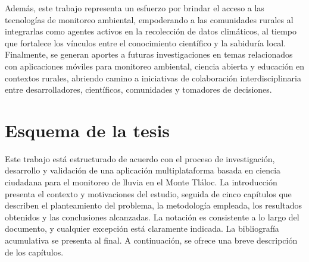 Además, este trabajo representa un esfuerzo por brindar el acceso a las tecnologías de monitoreo ambiental, empoderando a las comunidades rurales al integrarlas como agentes activos en la recolección de datos climáticos, al tiempo que fortalece los vínculos entre el conocimiento científico y la sabiduría local. Finalmente, se generan aportes a futuras investigaciones en temas relacionados con aplicaciones móviles para monitoreo ambiental, ciencia abierta y educación en contextos rurales, abriendo camino a iniciativas de colaboración interdisciplinaria entre desarrolladores, científicos, comunidades y tomadores de decisiones.












\section{Esquema de la tesis}

Este trabajo está estructurado de acuerdo con el proceso de investigación, desarrollo y validación de una aplicación multiplataforma basada en ciencia ciudadana para el monitoreo de lluvia en el Monte Tláloc. La introducción presenta el contexto y motivaciones del estudio, seguida de cinco capítulos que describen el planteamiento del problema, la metodología empleada, los resultados obtenidos y las conclusiones alcanzadas. La notación es consistente a lo largo del documento, y cualquier excepción está claramente indicada. La bibliografía acumulativa se presenta al final. A continuación, se ofrece una breve descripción de los capítulos.





